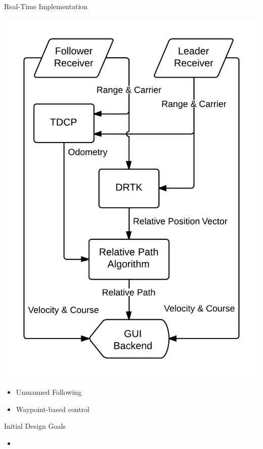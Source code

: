 \documentclass{beamer}
\begin{document}
  \begin{frame}{Real-Time Implementation}
    \begin{minipage}{0.45\textwidth}
      \centering
      \includegraphics[width=\textwidth]{../graphics/data_algo.png}
    \end{minipage}
    \begin{minipage}{0.45\textwidth}
      \begin{itemize}
        \item Unmanned Following
        \item Waypoint-based control
      \end{itemize}
    \end{minipage}
  \end{frame}


  \begin{frame}{Initial Design Goals}
    \begin{itemize}
      \item
    \end{itemize}
  \end{frame}
\end{document}
